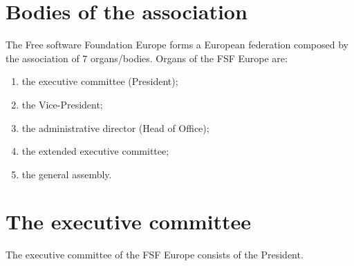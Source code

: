 \documentclass[a4wide,12pt]{article}
\begin{document}


\section{Bodies of the association}
The Free software Foundation Europe forms a European federation
composed by the association of 7 organs/bodies. Organs of the FSF
Europe are:
\renewcommand{\labelenumi}{\alph{enumi})}
\begin{enumerate}
\item the executive committee (President);
\item the Vice-President;
\item the administrative director (Head of Office);
\item the extended executive committee;
\item the general assembly.
\end{enumerate}
\renewcommand{\labelenumi}{\arabic{enumi}.}



\section{The executive committee}
The executive committee of the FSF Europe consists of the President.


\end{document}
